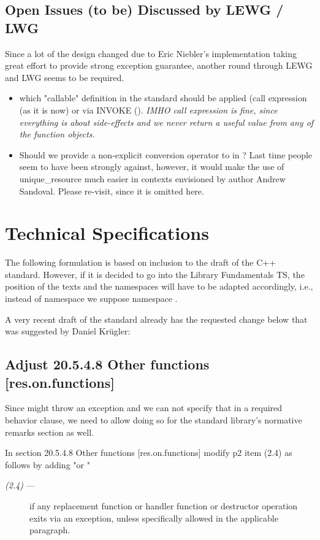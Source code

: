 \documentclass[ebook,11pt,article]{memoir}
\begin{document}
\section{Open Issues (to be) Discussed by LEWG / LWG}
Since a lot of the design changed due to Eric Niebler's implementation taking great effort to provide strong exception guarantee, another round through LEWG and LWG seems to be required.
\begin{itemize}
\item which "callable" definition in the standard should be applied (call expression (as it is now) or via INVOKE (). 
\emph{IMHO call expression is fine, since everything is about side-effects and we never return a useful value from any of the function objects.}
\item Should we provide a non-explicit conversion operator to  in  ? Last time people seem to have been strongly against, however, it would make the use of unique_resource much easier in contexts envisioned by author Andrew Sandoval. Please re-visit, since it is omitted here.
\end{itemize}

\newpage
\chapter{Technical Specifications}
The following formulation is based on inclusion to the draft of the C++ standard. However, if it is decided to go into the Library Fundamentals TS, the position of the texts and the namespaces will have to be adapted accordingly, i.e., instead of namespace  we suppose namespace . 

A very recent draft of the standard already has the requested change below that was suggested by Daniel Kr\"ugler:

\section{Adjust 20.5.4.8 Other functions [res.on.functions]}
Since  might throw an exception and we can not specify that in a required behavior clause, we need to allow doing so for the standard library's normative remarks section as well.

In section 20.5.4.8 Other functions [res.on.functions] modify p2 item (2.4) as follows by adding "or \remarks"

\begin{description}
\item[\textit{(2.4)} ---]
if any replacement function or handler function or destructor operation exits via an exception,
unless specifically allowed
in the applicable
\required {}
paragraph.
\end{description}
\end{document}
